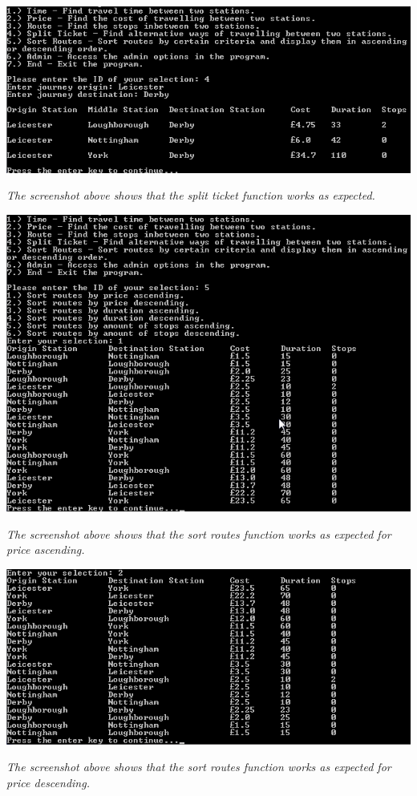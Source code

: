 \documentclass[10pt, a4paper]{article}
\begin{document}
\includegraphics{Functionality6.png}

\textit{The screenshot above shows that the split ticket function works as expected.}

\includegraphics{Functionality7.png}

\textit{The screenshot above shows that the sort routes function works as expected for price ascending.}

\newpage
\includegraphics{Functionality8.png}

\textit{The screenshot above shows that the sort routes function works as expected for price descending.}
\end{document}

